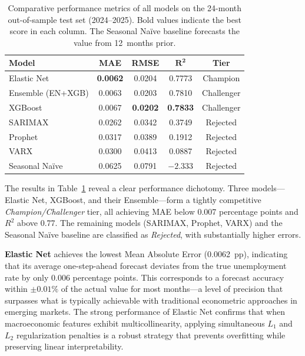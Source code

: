 \documentclass[14pt, a4paper]{extarticle}
\begin{document}
\begin{table}[H]
\centering
\caption{Comparative performance metrics of all models on the 24-month out-of-sample test set (2024--2025). Bold values indicate the best score in each column. The Seasonal Na\"ive baseline forecasts the value from 12~months prior.}
\label{tab:final_results}
\begin{tabular}{@{}lcccc@{}}
\toprule
\textbf{Model} & \textbf{MAE} & \textbf{RMSE} & \textbf{$\boldsymbol{R^2}$} & \textbf{Tier} \\
\midrule
Elastic Net           & \textbf{0.0062} & 0.0204 & 0.7773 & Champion \\
Ensemble (EN+XGB)     & 0.0063 & 0.0203 & 0.7810 & Challenger \\
XGBoost               & 0.0067 & \textbf{0.0202} & \textbf{0.7833} & Challenger \\
SARIMAX               & 0.0262 & 0.0342 & 0.3749 & Rejected \\
Prophet               & 0.0317 & 0.0389 & 0.1912 & Rejected \\
VARX                  & 0.0300 & 0.0413 & 0.0887 & Rejected \\
Seasonal Na\"ive      & 0.0625 & 0.0791 & $-2.333$ & Rejected \\
\bottomrule
\end{tabular}
\end{table}

The results in Table~\ref{tab:final_results} reveal a clear performance dichotomy. Three models---Elastic Net, XGBoost, and their Ensemble---form a tightly competitive \textit{Champion/Challenger} tier, all achieving MAE below 0.007 percentage points and $R^2$ above 0.77. The remaining models (SARIMAX, Prophet, VARX) and the Seasonal Na\"ive baseline are classified as \textit{Rejected}, with substantially higher errors.

\textbf{Elastic Net} achieves the lowest Mean Absolute Error (0.0062~pp), indicating that its average one-step-ahead forecast deviates from the true unemployment rate by only 0.006 percentage points. This corresponds to a forecast accuracy within $\pm 0.01\%$ of the actual value for most months---a level of precision that surpasses what is typically achievable with traditional econometric approaches in emerging markets. The strong performance of Elastic Net confirms that when macroeconomic features exhibit multicollinearity, applying simultaneous $L_1$ and $L_2$ regularization penalties is a robust strategy that prevents overfitting while preserving linear interpretability.
\end{document}
